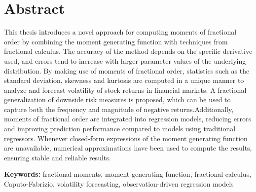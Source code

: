 \section*{Abstract}
This thesis introduces a novel approach for computing moments of fractional order by combining the moment generating function with techniques from fractional calculus. The accuracy of the method depends on the specific derivative used, and errors tend to increase with larger parameter values of the underlying distribution. By making use of moments of fractional order, statistics such as the standard deviation, skewness and kurtosis are computed in a unique manner to analyze and forecast volatility of stock returns in financial markets. A fractional generalization of downside risk measures is proposed, which can be used to capture both the frequency and magnitude of negative returns.Additionally, moments of fractional order are integrated into regression models, reducing errors and improving prediction performance compared to models using traditional regressors. Whenever closed-form expressions of the moment generating function are unavailable, numerical approximations have been used to compute the results, ensuring stable and reliable results.

\bigskip\noindent
\textbf{Keywords:} fractional moments, moment generating function, fractional calculus, Caputo-Fabrizio, volatility forecasting, observation-driven regression models